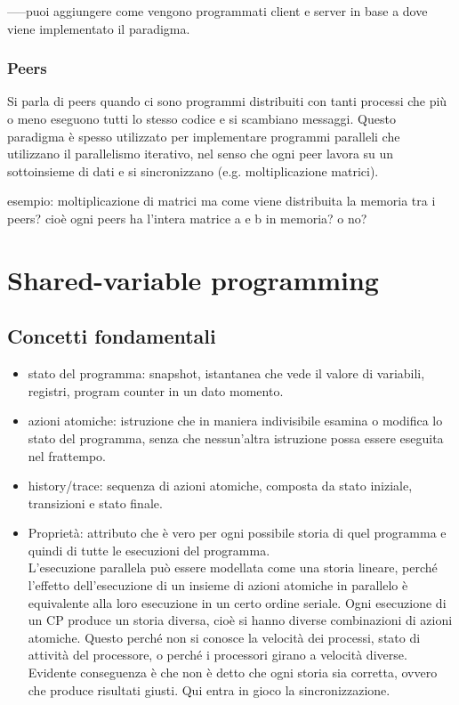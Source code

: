 \documentclass[10pt,a4paper]{book}
\begin{document}
-----puoi aggiungere come vengono programmati client e server in base a dove viene implementato il paradigma.

\subsection{Peers}
Si parla di peers quando ci sono programmi distribuiti con tanti processi che più o meno eseguono tutti lo stesso codice e si scambiano messaggi. Questo paradigma è spesso utilizzato per implementare programmi paralleli che utilizzano il parallelismo iterativo, nel senso che ogni peer lavora su un sottoinsieme di dati e si sincronizzano (e.g. moltiplicazione matrici).

esempio: moltiplicazione di matrici ma come viene distribuita la memoria tra i peers? cioè ogni peers ha l'intera matrice a e b in memoria? o no?




\chapter{Shared-variable programming}
\section{Concetti fondamentali}
\begin{itemize}
\item stato del programma: snapshot, istantanea che vede il valore di variabili, registri, program counter in un dato momento.
\item azioni atomiche: istruzione che in maniera indivisibile esamina o modifica lo stato del programma, senza che nessun'altra istruzione possa essere eseguita nel frattempo.
\item history/trace: sequenza di azioni atomiche, composta da stato iniziale, transizioni e stato finale.
\item Proprietà: attributo che è vero per ogni possibile storia di quel programma e quindi di tutte le esecuzioni del programma.\\
 L'esecuzione parallela può essere modellata come una storia lineare, perché l'effetto dell'esecuzione di un insieme di azioni atomiche in parallelo è equivalente alla loro esecuzione in un certo ordine seriale.
Ogni esecuzione di un CP produce un storia diversa, cioè si hanno diverse combinazioni di azioni atomiche. Questo perché non si conosce la velocità dei processi, stato di attività del processore, o perché i processori girano a velocità diverse. Evidente conseguenza è che non è detto che ogni storia sia corretta, ovvero che produce risultati giusti. Qui entra in gioco la sincronizzazione.
\end{itemize}
\end{document}
